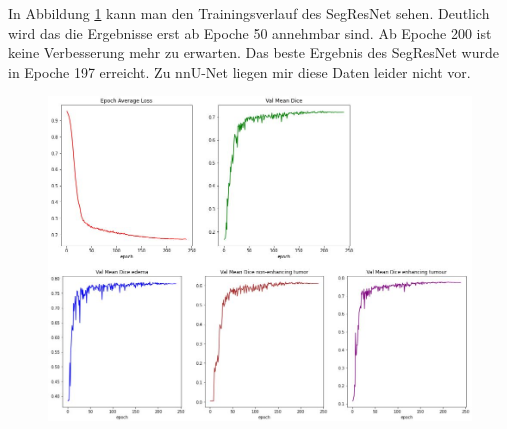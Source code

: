 In Abbildung \ref{fig:segresnetmetrics} kann man den Trainingsverlauf des SegResNet sehen. Deutlich wird das die Ergebnisse erst ab Epoche 50 annehmbar sind. Ab Epoche 200 ist keine Verbesserung mehr zu erwarten. Das beste Ergebnis des SegResNet wurde in Epoche 197 erreicht. Zu nnU-Net liegen mir diese Daten leider nicht vor.
\begin{figure}[H]
\includegraphics[width=\linewidth]{./images/segresnetmetrics.jpg}
\label{fig:segresnetmetrics}
\end{figure}